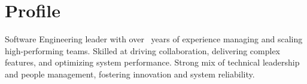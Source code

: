 \section{Profile}

    \begin{onecolentry}
        Software Engineering leader with over \yearsOfExp\ years of experience managing and scaling high-performing teams.
        Skilled at driving collaboration, delivering complex features, and optimizing system performance. Strong mix of technical leadership and people management, fostering innovation and system reliability.
    \end{onecolentry}
